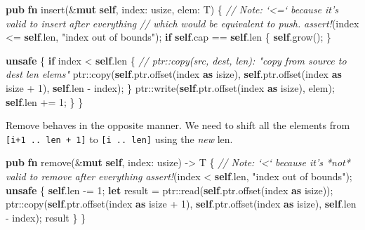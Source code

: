 \documentclass[a4paper,]{book}
\newenvironment{Shaded}{\begin{snugshade}}{\end{snugshade}}
\newcommand{\KeywordTok}[1]{\textcolor[rgb]{0.13,0.29,0.53}{\textbf{{#1}}}}
\newcommand{\DataTypeTok}[1]{\textcolor[rgb]{0.13,0.29,0.53}{{#1}}}
\newcommand{\DecValTok}[1]{\textcolor[rgb]{0.00,0.00,0.81}{{#1}}}
\newcommand{\StringTok}[1]{\textcolor[rgb]{0.31,0.60,0.02}{{#1}}}
\newcommand{\CommentTok}[1]{\textcolor[rgb]{0.56,0.35,0.01}{\textit{{#1}}}}
\newcommand{\PreprocessorTok}[1]{\textcolor[rgb]{0.56,0.35,0.01}{\textit{{#1}}}}
\newcommand{\NormalTok}[1]{{#1}}
\begin{document}
\begin{Shaded}
\begin{Highlighting}[]
\KeywordTok{pub} \KeywordTok{fn} \NormalTok{insert(&}\KeywordTok{mut} \KeywordTok{self}\NormalTok{, index: }\DataTypeTok{usize}\NormalTok{, elem: T) \{}
    \CommentTok{// Note: `<=` because it's valid to insert after everything}
    \CommentTok{// which would be equivalent to push.}
    \PreprocessorTok{assert!}\NormalTok{(index <= }\KeywordTok{self}\NormalTok{.len, }\StringTok{"index out of bounds"}\NormalTok{);}
    \KeywordTok{if} \KeywordTok{self}\NormalTok{.cap == }\KeywordTok{self}\NormalTok{.len \{ }\KeywordTok{self}\NormalTok{.grow(); \}}

    \KeywordTok{unsafe} \NormalTok{\{}
        \KeywordTok{if} \NormalTok{index < }\KeywordTok{self}\NormalTok{.len \{}
            \CommentTok{// ptr::copy(src, dest, len): "copy from source to dest len elems"}
            \NormalTok{ptr::copy(}\KeywordTok{self}\NormalTok{.ptr.offset(index }\KeywordTok{as} \DataTypeTok{isize}\NormalTok{),}
                      \KeywordTok{self}\NormalTok{.ptr.offset(index }\KeywordTok{as} \DataTypeTok{isize} \NormalTok{+ }\DecValTok{1}\NormalTok{),}
                      \KeywordTok{self}\NormalTok{.len - index);}
        \NormalTok{\}}
        \NormalTok{ptr::write(}\KeywordTok{self}\NormalTok{.ptr.offset(index }\KeywordTok{as} \DataTypeTok{isize}\NormalTok{), elem);}
        \KeywordTok{self}\NormalTok{.len += }\DecValTok{1}\NormalTok{;}
    \NormalTok{\}}
\NormalTok{\}}
\end{Highlighting}
\end{Shaded}

Remove behaves in the opposite manner. We need to shift all the elements
from \texttt{{[}i+1\ ..\ len\ +\ 1{]}} to \texttt{{[}i\ ..\ len{]}}
using the \emph{new} len.

\begin{Shaded}
\begin{Highlighting}[]
\KeywordTok{pub} \KeywordTok{fn} \NormalTok{remove(&}\KeywordTok{mut} \KeywordTok{self}\NormalTok{, index: }\DataTypeTok{usize}\NormalTok{) -> T \{}
    \CommentTok{// Note: `<` because it's *not* valid to remove after everything}
    \PreprocessorTok{assert!}\NormalTok{(index < }\KeywordTok{self}\NormalTok{.len, }\StringTok{"index out of bounds"}\NormalTok{);}
    \KeywordTok{unsafe} \NormalTok{\{}
        \KeywordTok{self}\NormalTok{.len -= }\DecValTok{1}\NormalTok{;}
        \KeywordTok{let} \NormalTok{result = ptr::read(}\KeywordTok{self}\NormalTok{.ptr.offset(index }\KeywordTok{as} \DataTypeTok{isize}\NormalTok{));}
        \NormalTok{ptr::copy(}\KeywordTok{self}\NormalTok{.ptr.offset(index }\KeywordTok{as} \DataTypeTok{isize} \NormalTok{+ }\DecValTok{1}\NormalTok{),}
                  \KeywordTok{self}\NormalTok{.ptr.offset(index }\KeywordTok{as} \DataTypeTok{isize}\NormalTok{),}
                  \KeywordTok{self}\NormalTok{.len - index);}
        \NormalTok{result}
    \NormalTok{\}}
\NormalTok{\}}
\end{Highlighting}
\end{Shaded}
\end{document}
